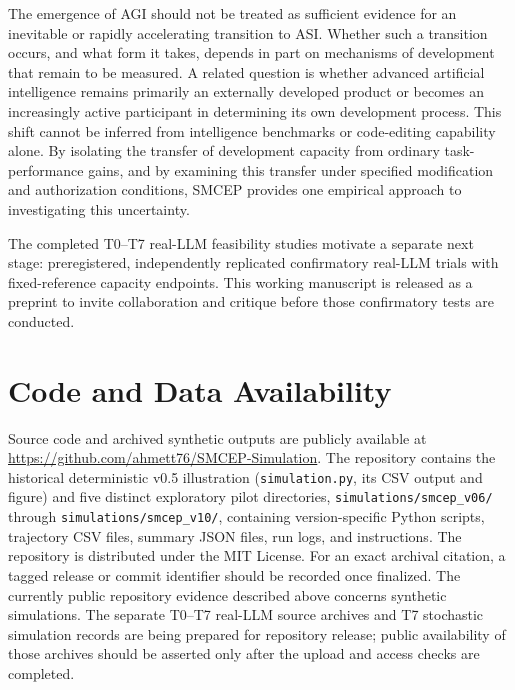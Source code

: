 \documentclass[11pt,a4paper]{article}
\begin{document}
The emergence of AGI should not be treated as sufficient evidence for an inevitable or rapidly accelerating transition to ASI. Whether such a transition occurs, and what form it takes, depends in part on mechanisms of development that remain to be measured. A related question is whether advanced artificial intelligence remains primarily an externally developed product or becomes an increasingly active participant in determining its own development process. This shift cannot be inferred from intelligence benchmarks or code-editing capability alone. By isolating the transfer of development capacity from ordinary task-performance gains, and by examining this transfer under specified modification and authorization conditions, SMCEP provides one empirical approach to investigating this uncertainty.

The completed T0--T7 real-LLM feasibility studies motivate a separate next stage: preregistered, independently replicated confirmatory real-LLM trials with fixed-reference capacity endpoints. This working manuscript is released as a preprint to invite collaboration and critique before those confirmatory tests are conducted.



\section{Code and Data Availability}
Source code and archived synthetic outputs are publicly available at \url{https://github.com/ahmett76/SMCEP-Simulation}. The repository contains the historical deterministic v0.5 illustration (\texttt{simulation.py}, its CSV output and figure) and five distinct exploratory pilot directories, \texttt{simulations/smcep\_v06/} through \texttt{simulations/smcep\_v10/}, containing version-specific Python scripts, trajectory CSV files, summary JSON files, run logs, and instructions. The repository is distributed under the MIT License. For an exact archival citation, a tagged release or commit identifier should be recorded once finalized. The currently public repository evidence described above concerns synthetic simulations. The separate T0--T7 real-LLM source archives and T7 stochastic simulation records are being prepared for repository release; public availability of those archives should be asserted only after the upload and access checks are completed.
\end{document}
